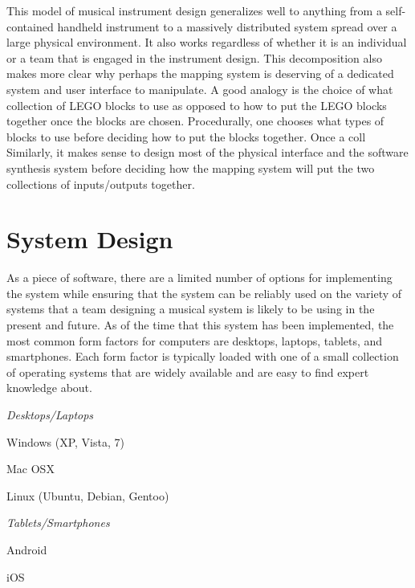 This model of musical instrument design generalizes well to anything from a self-contained handheld instrument to a massively distributed system spread over a large physical environment. It also works regardless of whether it is an individual or a team that is engaged in the instrument design. This decomposition also makes more clear why perhaps the mapping system is deserving of a dedicated system and user interface to manipulate. A good analogy is the choice of what collection of LEGO blocks to use as opposed to how to put the LEGO blocks together once the blocks are chosen. Procedurally, one chooses what types of blocks to use before deciding how to put the blocks together. Once a coll Similarly, it makes sense to design most of the physical interface and the software synthesis system before deciding how the mapping system will put the two collections of inputs/outputs together.

\section{System Design}

As a piece of software, there are a limited number of options for implementing the system while ensuring that the system can be reliably used on the variety of systems that a team designing a musical system is likely to be using in the present and future. As of the time that this system has been implemented, the most common form factors for computers are desktops, laptops, tablets, and smartphones. Each form factor is typically loaded with one of a small collection of operating systems that are widely available and are easy to find expert knowledge about.

\begin{description}
\item \emph{Desktops/Laptops}
\begin{description}
\item Windows (XP, Vista, 7)
\item Mac OSX
\item Linux (Ubuntu, Debian, Gentoo)
\end{description}
\item \emph{Tablets/Smartphones}
\begin{description}
\item Android
\item iOS
\end{description}
\end{description}



